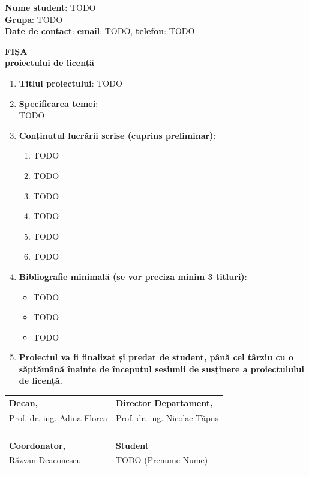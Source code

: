 \documentclass[12pt]{article}
\begin{document}
\textbf{Nume student}: TODO \\
\textbf{Grupa}: TODO \\
\textbf{Date de contact}: \textbf{email}: TODO, \textbf{telefon}: TODO

\vspace{7mm}

\begin{center}
  \large{\textbf{FIȘA\\
  proiectului de licență}}
\end{center}

\vspace{7mm}

\begin{enumerate}
  \item \textbf{Titlul proiectului}: TODO
  \item \textbf{Specificarea temei}:\\
    TODO
  \item \textbf{Conținutul lucrării scrise (cuprins preliminar)}:
    \begin{enumerate}
      \item TODO
      \item TODO
      \item TODO
      \item TODO
      \item TODO
      \item TODO
    \end{enumerate}
  \item \textbf{Bibliografie minimală (se vor preciza minim 3 titluri)}:
    \begin{itemize}
      \item TODO
      \item TODO
      \item TODO
    \end{itemize}
  \item \textbf{Proiectul va fi finalizat și predat de student, până cel
      târziu cu o săptămână înainte de începutul sesiunii de susținere a
    proiectulului de licență.}
\end{enumerate}

\vspace{10mm}

\begin{center}
  \begin{tabular}{@{}p{}p{}@{}}
    \textbf{Decan,} & \textbf{Director Departament,} \\
    Prof. dr. ing. Adina Florea & Prof. dr. ing. Nicolae Țăpuș \\
    & \\
    & \\
    & \\
    & \\
    \textbf{Coordonator,} & \textbf{Student} \\
    Răzvan Deaconescu & TODO (Prenume Nume) \\
    & \\
  \end{tabular}
\end{center}
\end{document}
